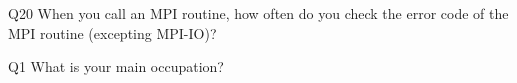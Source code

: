 \begin{description}%
\item{Q20} When you call an MPI routine, how often do you check the error code of the MPI routine  (excepting MPI-IO)?%
\item{Q1} What is your main occupation?%
\end{description}%
